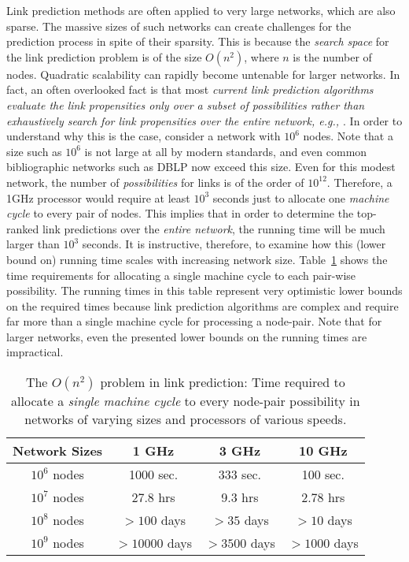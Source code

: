 \documentclass[10pt,journal,compsoc]{IEEEtran}
\newcommand{\eat}[1]{}
\newcounter{ccc}
\newcommand{\DBLP}{{\sf DBLP}\xspace}
\begin{document}
Link prediction methods are often applied to very large networks,
which are also sparse.  The massive sizes of such networks can
create challenges for the prediction process in spite of their
sparsity. This is because the {\em search space} for the link
prediction problem is of the size $O(n^2)$, where $n$ is the number
of nodes. Quadratic scalability can rapidly become untenable for
larger networks. In fact, an often overlooked fact is that most {\em
current link prediction algorithms evaluate the link
propensities only over a subset of possibilities rather than
exhaustively search for link propensities over the entire network, e.g.,
\cite{dwang,lee}}.
%
\eat{%
{\bf Charu Note: We do need to check this by looking at as many link
prediction papers as possible. At least the ones that I saw seemed
to have this property.}
}%
%
In order to understand why this is the case,
consider a network with $10^6$ nodes. Note that a size such as
$10^6$ is not large at all by modern standards, and even common
bibliographic networks such as \DBLP now exceed this size. Even
for this modest network, the number of {\em possibilities} for links
is of the order of $10^{12}$. Therefore, a 1GHz processor would
require at least $10^3$ seconds just to allocate one {\em machine cycle} to
every pair of nodes. This implies that in order to determine the
top-ranked link predictions over the {\em entire network}, the
running time will be much larger than $10^3$ seconds.  It is
instructive, therefore, to examine how this (lower bound on) running
time scales with increasing network size. Table~\ref{time} shows the
time requirements for allocating a single machine cycle to each
pair-wise possibility. The running times in this table represent
very optimistic lower bounds on the required times because link
prediction algorithms are complex and require far more than a single
machine cycle for processing a node-pair. Note that for larger
networks, even the presented lower bounds on the running times are
impractical.
\begin{table}
\caption{The $O(n^2)$ problem in link prediction: Time required to
allocate a {\em single machine cycle} to every node-pair possibility
in networks of varying sizes and processors of various speeds.}
\label{time}
\vspace{-2ex}
\centering
\begin{tabular}{cccc}
\hline \hline Network Sizes & 1 GHz &  3 GHz & 10 GHz \\
\hline \hline $10^6$ nodes & 1000 sec. & 333 sec. & 100 sec.\\
\hline $10^7$ nodes & 27.8 hrs &  9.3 hrs &  2.78 hrs\\
\hline $10^8$ nodes & $>100$ days &  $>35$ days & $> 10$ days\\
\hline $10^9$ nodes & $>10000$ days & $>3500$ days & $> 1000$ days\\
\hline \hline
\end{tabular}
\end{table}
\end{document}
